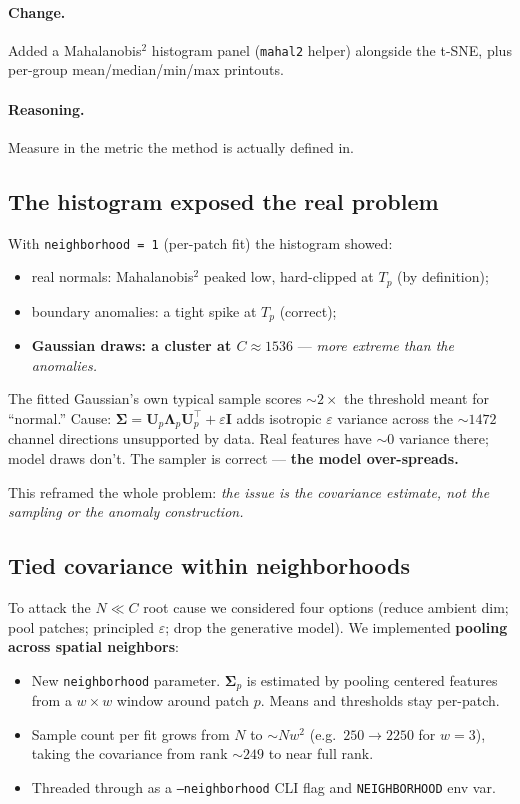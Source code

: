 \documentclass[11pt]{article}
\newcommand{\code}[1]{\texttt{#1}}
\newcommand{\Up}{\mathbf{U}_p}
\newcommand{\bSigma}{\boldsymbol{\Sigma}}
\newcommand{\bLambda}{\boldsymbol{\Lambda}}
\begin{document}
\paragraph{Change.}
Added a Mahalanobis$^2$ histogram panel (\code{mahal2} helper) alongside the
t-SNE, plus per-group mean/median/min/max printouts.

\paragraph{Reasoning.}
Measure in the metric the method is actually defined in.

\subsection{The histogram exposed the real problem}

With \code{neighborhood = 1} (per-patch fit) the histogram showed:
\begin{itemize}[noitemsep]
  \item real normals: Mahalanobis$^2$ peaked low, hard-clipped at $T_p$ (by
    definition);
  \item boundary anomalies: a tight spike at $T_p$ (correct);
  \item \textbf{Gaussian draws: a cluster at $C \approx 1536$} --- \emph{more
    extreme than the anomalies.}
\end{itemize}
The fitted Gaussian's own typical sample scores $\sim 2\times$ the threshold meant
for ``normal.'' Cause: $\bSigma = \Up \bLambda_p \Up^\top + \varepsilon \mathbf{I}$
adds isotropic $\varepsilon$ variance across the ${\sim}1472$ channel directions
unsupported by data. Real features have ${\sim}0$ variance there; model draws
don't. The sampler is correct --- \textbf{the model over-spreads.}

This reframed the whole problem: \emph{the issue is the covariance estimate, not
the sampling or the anomaly construction.}

\subsection{Tied covariance within neighborhoods}

To attack the $N \ll C$ root cause we considered four options (reduce ambient
dim; pool patches; principled $\varepsilon$; drop the generative model). We
implemented \textbf{pooling across spatial neighbors}:
\begin{itemize}[noitemsep]
  \item New \code{neighborhood} parameter. $\bSigma_p$ is estimated by pooling
    centered features from a $w \times w$ window around patch $p$. Means and
    thresholds stay per-patch.
  \item Sample count per fit grows from $N$ to ${\sim}N w^2$ (e.g.\ $250 \to 2250$
    for $w = 3$), taking the covariance from rank ${\sim}249$ to near full rank.
  \item Threaded through as a \code{--neighborhood} CLI flag and
    \code{NEIGHBORHOOD} env var.
\end{itemize}
\end{document}
